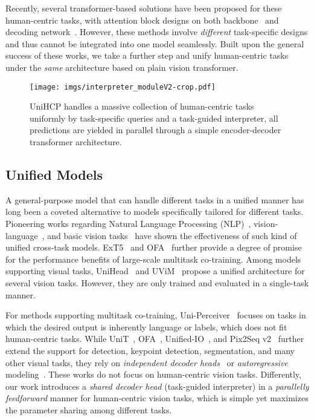 \documentclass[10pt,twocolumn,letterpaper]{article}
\begin{document}
Recently, several transformer-based solutions have been proposed for these human-centric tasks, with attention block designs on both backbone~\cite{yuan2021hrformer,he2021transreid,xu2022vitpose} and decoding network~\cite{li2021tokenpose,mao2022poseur,liu2021query2label,li2022label2label,xu2022fashionformer,zheng2022progressive}. However, these methods involve \textit{different} task-specific designs and thus cannot be integrated into one model seamlessly. Built upon the general success of these works, we take a further step and unify human-centric tasks under the \textit{same} architecture based on plain vision transformer.



\begin{figure*}[t]
    \centering
    \texttt{[image: imgs/interpreter\_moduleV2-crop.pdf]}
    \caption{UniHCP handles a massive collection of human-centric tasks  uniformly by task-specific queries and a task-guided interpreter, all predictions are yielded in parallel through a simple encoder-decoder transformer architecture.}
\label{fig:arch}
\end{figure*}


\subsection{Unified Models}
A general-purpose model that can handle different tasks in a unified manner has long been a coveted alternative to models specifically tailored for different tasks.
Pioneering works regarding Natural Language Processing (NLP)~\cite{raffel2020exploring}, vision-language~\cite{lu202012}, and basic vision tasks~\cite{sermanet2013overfeat,kokkinos2017ubernet} have shown the effectiveness of such kind of unified cross-task models. 
ExT5~\cite{aribandi2021ext5} and OFA~\cite{wang2022ofa} further provide a degree of promise for the performance benefits of large-scale multitask co-training.
Among models supporting visual tasks, UniHead~\cite{liang2022unifying} and UViM~\cite{kolesnikov2022uvim} propose a unified architecture for several vision tasks. However, they are only trained and evaluated in a single-task manner.

For methods supporting multitask co-training, Uni-Perceiver~\cite{zhu2022uni} focuses on tasks in which the desired output is inherently language or labels, which does not fit human-centric tasks. While UniT~\cite{hu2021unit}, OFA~\cite{wang2022ofa}, Unified-IO~\cite{lu2022unified}, and Pix2Seq v2~\cite{chen2022unified} further extend the support for detection, keypoint detection, segmentation, and many other visual tasks, they rely on \emph{independent decoder heads}~\cite{hu2021unit,wang2022ofa} or \emph{autoregressive} modeling~\cite{chen2022unified,lu2022unified}. These works do not focus on  human-centric vision tasks.
Differently, our work introduces a \emph{shared decoder head} (task-guided interpreter) in a \emph{parallelly feedforward} manner for human-centric vision tasks, which is simple yet maximizes the parameter sharing among different tasks. 
\end{document}
